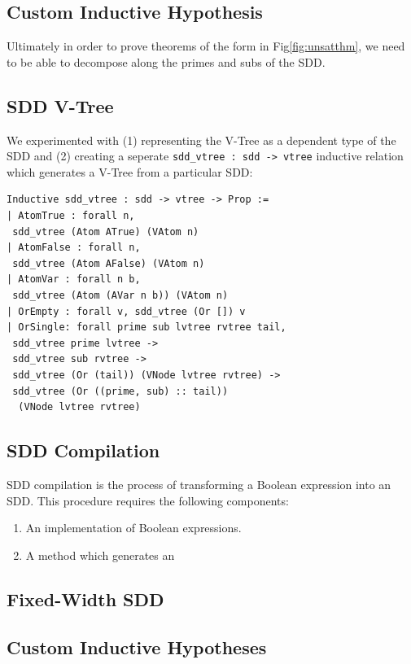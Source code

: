 \documentclass[twocolumn]{article}
\theoremstyle{definition}
\begin{document}
\subsection{Custom Inductive Hypothesis}
Ultimately in order to prove theorems of the form in Fig\ref{fig:unsatthm}, we
need to be able to decompose along the primes and subs of the SDD.


\subsection{SDD V-Tree}\label{sec:vtree}
We experimented with (1) representing the V-Tree as a dependent type of the SDD
and (2) creating a seperate \texttt{sdd\_vtree : sdd -> vtree} inductive relation which
generates a V-Tree from a particular SDD:

\begin{verbatim}
Inductive sdd_vtree : sdd -> vtree -> Prop :=
| AtomTrue : forall n, 
 sdd_vtree (Atom ATrue) (VAtom n)
| AtomFalse : forall n, 
 sdd_vtree (Atom AFalse) (VAtom n)
| AtomVar : forall n b, 
 sdd_vtree (Atom (AVar n b)) (VAtom n)
| OrEmpty : forall v, sdd_vtree (Or []) v
| OrSingle: forall prime sub lvtree rvtree tail, 
 sdd_vtree prime lvtree ->
 sdd_vtree sub rvtree ->
 sdd_vtree (Or (tail)) (VNode lvtree rvtree) ->
 sdd_vtree (Or ((prime, sub) :: tail)) 
  (VNode lvtree rvtree)

\end{verbatim}

\subsection{SDD Compilation}
SDD compilation is the process of transforming a Boolean expression into an SDD.
This procedure requires the following components:
\begin{enumerate}
\item An implementation of Boolean expressions.
\item A method which generates an 
\end{enumerate}

\subsection{Fixed-Width SDD}
\subsection{Custom Inductive Hypotheses}





\end{document}
